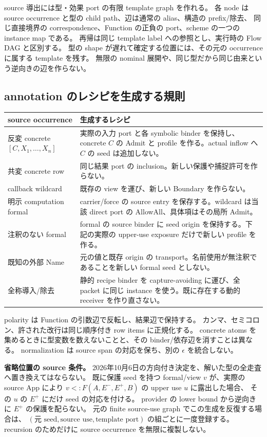 \documentclass[11pt,a4paper]{article}
\begin{document}
source 導出には型・効果 port の有限 template graph を作れる。
各 node は source occurrence と型の child path、辺は通常の alias、構造の prefix/除去、
同じ直接境界の correspondence、Function の正負の port、scheme の一つの instance map である。
再帰は同じ template label への参照とし、実行時の Flow DAG と区別する。
型の shape が遅れて確定する位置には、その元の occurrence に属する template を残す。
無限の nominal 展開や、同じ型だから同じ由来という逆向きの辺を作らない。

\subsection{annotation のレシピを生成する規則}

\begin{longtable}{>{\raggedright\arraybackslash}p{}>{\raggedright\arraybackslash}p{}}
\toprule source occurrence & 生成するレシピ \\
\midrule\endhead
反変 concrete \([C,X_1,\ldots,X_n]\) & 実際の入力 port と各 symbolic binder を保持し、concrete \(C\) の Admit と profile を作る。actual inflow へ \(C\) の seed は追加しない。\\
共変 concrete row & 同じ結果 port の inclusion。新しい保護や捕捉許可を作らない。\\
callback wildcard & 既存の view を運び、新しい Boundary を作らない。\\
明示 computation formal & carrier/force の source entry を保存する。wildcard は当該 direct port の AllowAll、具体項はその局所 Admit。\\
注釈のない formal & formal の source binder に seed origin を保持する。下記の実際の upper-use exposure だけで新しい profile を作る。\\
既知の外部 Name & 元の値と既存 origin の transport。名前使用が無注釈であることを新しい formal seed としない。\\
全称導入/除去 & 静的 recipe binder を capture-avoiding に運び、全 packet に同じ instance を使う。既に存在する動的 receiver を作り直さない。\\
\bottomrule
\end{longtable}

polarity は Function の引数辺で反転し、結果辺で保持する。
カンマ、セミコロン、許された改行は同じ順序付き row items に正規化する。
concrete atoms を集めるときに型変数を数えないことと、その binder/依存辺を消すことは異なる。
normalization は source span の対応を保ち、別の \(\epsilon\) を統合しない。

\textbf{省略位置の source 条件。}
2026年10月6日の方向付き決定を、解いた型の全走査へ置き換えてはならない。
既に保護 seed を持つ formal/view \(v\) が、実際の source App により
\(v<:F(A,E^-,E^+,B)\) の upper use \(u\) に露出した場合、
その \(u\) の \(E^+\) にだけ seed の対応を付ける。
provider の lower bound から逆向きに \(E^+\) の保護を配らない。
元の finite source-use graph でこの生成を反復する場合は、
\((\text{元 seed},\text{source use},\text{template port})\) の組ごとに一度登録する。
recursion のためだけに source occurrence を無限に複製しない。
\end{document}
